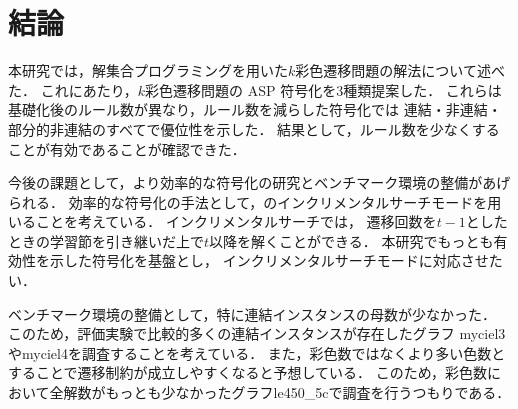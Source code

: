 \section{結論} \label{chap:conclusion}
本研究では，解集合プログラミングを用いた$k$彩色遷移問題の解法について述べた．
これにあたり，$k$彩色遷移問題の ASP 符号化を3種類提案した．
これらは基礎化後のルール数が異なり，ルール数を減らした符号化では
連結・非連結・部分的非連結のすべてで優位性を示した．
結果として，ルール数を少なくすることが有効であることが確認できた．

今後の課題として，より効率的な符号化の研究とベンチマーク環境の整備があげられる．
効率的な符号化の手法として，{\clingo}のインクリメンタルサーチモードを用いることを考えている．
インクリメンタルサーチでは，
遷移回数を$t-1$としたときの学習節を引き継いだ上で$t$以降を解くことができる．
本研究でもっとも有効性を示した符号化を基盤とし，
インクリメンタルサーチモードに対応させたい．

ベンチマーク環境の整備として，特に連結インスタンスの母数が少なかった．
このため，評価実験で比較的多くの連結インスタンスが存在したグラフ
myciel3やmyciel4を調査することを考えている．
また，彩色数ではなくより多い色数とすることで遷移制約が成立しやすくなると予想している．
このため，彩色数において全解数がもっとも少なかったグラフle450\_5cで調査を行うつもりである．


